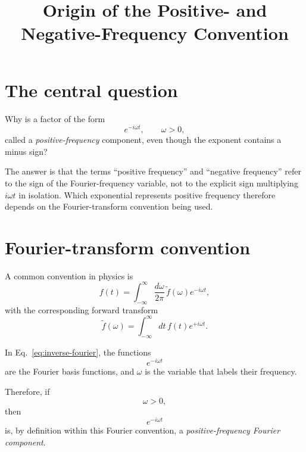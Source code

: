 \documentclass[11pt]{article}
\title{Origin of the Positive- and Negative-Frequency Convention}
\author{}
\date{}
\begin{document}
\maketitle

\section{The central question}

Why is a factor of the form
\begin{equation}
e^{-i\omega t},
\qquad \omega>0,
\label{eq:exp-minus}
\end{equation}
called a \emph{positive-frequency} component, even though the exponent contains a minus sign?

The answer is that the terms ``positive frequency'' and ``negative frequency'' refer to the sign of the Fourier-frequency variable, not to the explicit sign multiplying $i\omega t$ in isolation. Which exponential represents positive frequency therefore depends on the Fourier-transform convention being used.

\section{Fourier-transform convention}

A common convention in physics is
\begin{equation}
f(t)
=
\int_{-\infty}^{\infty}
\frac{d\omega}{2\pi}\,
\widetilde f(\omega)e^{-i\omega t},
\label{eq:inverse-fourier}
\end{equation}
with the corresponding forward transform
\begin{equation}
\widetilde f(\omega)
=
\int_{-\infty}^{\infty}
dt\,
f(t)e^{+i\omega t}.
\label{eq:forward-fourier}
\end{equation}

In Eq.~\eqref{eq:inverse-fourier}, the functions
\begin{equation}
e^{-i\omega t}
\label{eq:fourier-basis}
\end{equation}
are the Fourier basis functions, and $\omega$ is the variable that labels their frequency.

Therefore, if
\begin{equation}
\omega>0,
\end{equation}
then
\begin{equation}
e^{-i\omega t}
\end{equation}
is, by definition within this Fourier convention, a \emph{positive-frequency Fourier component}.
\end{document}
